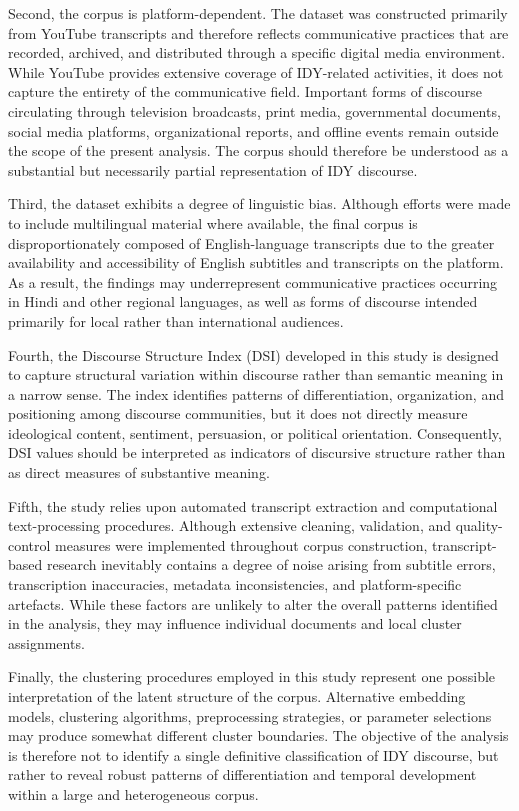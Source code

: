 \documentclass[11pt]{article}
\begin{document}
Second, the corpus is platform-dependent. The dataset was constructed primarily from YouTube transcripts and therefore
reflects communicative practices that are recorded, archived, and distributed through a specific digital media
environment. While YouTube provides extensive coverage of IDY-related activities, it does not capture the entirety of
the communicative field. Important forms of discourse circulating through television broadcasts, print media,
governmental documents, social media platforms, organizational reports, and offline events remain outside the scope of
the present analysis. The corpus should therefore be understood as a substantial but necessarily partial representation
of IDY discourse.


Third, the dataset exhibits a degree of linguistic bias. Although efforts were made to include multilingual material
where available, the final corpus is disproportionately composed of English-language transcripts due to the greater
availability and accessibility of English subtitles and transcripts on the platform. As a result, the findings may
underrepresent communicative practices occurring in Hindi and other regional languages, as well as forms of discourse
intended primarily for local rather than international audiences.


Fourth, the Discourse Structure Index (DSI) developed in this study is designed to capture structural variation within
discourse rather than semantic meaning in a narrow sense. The index identifies patterns of differentiation,
organization, and positioning among discourse communities, but it does not directly measure ideological content,
sentiment, persuasion, or political orientation. Consequently, DSI values should be interpreted as indicators of
discursive structure rather than as direct measures of substantive meaning.


Fifth, the study relies upon automated transcript extraction and computational text-processing procedures. Although
extensive cleaning, validation, and quality-control measures were implemented throughout corpus construction,
transcript-based research inevitably contains a degree of noise arising from subtitle errors, transcription
inaccuracies, metadata inconsistencies, and platform-specific artefacts. While these factors are unlikely to alter the
overall patterns identified in the analysis, they may influence individual documents and local cluster assignments.


Finally, the clustering procedures employed in this study represent one possible interpretation of the latent structure
of the corpus. Alternative embedding models, clustering algorithms, preprocessing strategies, or parameter selections
may produce somewhat different cluster boundaries. The objective of the analysis is therefore not to identify a single
definitive classification of IDY discourse, but rather to reveal robust patterns of differentiation and temporal
development within a large and heterogeneous corpus.
\end{document}
